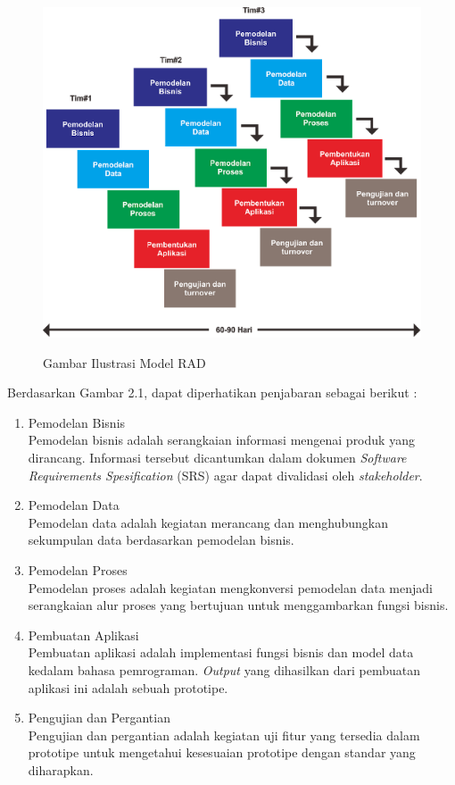 \begin{flushleft}
\begin{justify}
\begin{figure}[ht]
	    \includegraphics[width=12cm]{images/RAD.png}\\
            \caption{Gambar Ilustrasi Model RAD}
        \end{figure}
        Berdasarkan Gambar 2.1, dapat diperhatikan penjabaran sebagai berikut :
        \begin{enumerate}[label=\alph*.]
            \item Pemodelan Bisnis\\
            Pemodelan bisnis adalah serangkaian informasi mengenai produk yang dirancang. Informasi tersebut dicantumkan dalam dokumen \emph{Software Requirements Spesification} (SRS) agar dapat divalidasi oleh \emph{stakeholder}. 
            \item Pemodelan Data\\
            Pemodelan data adalah kegiatan merancang dan menghubungkan sekumpulan data berdasarkan pemodelan bisnis.
            \item Pemodelan Proses\\
            Pemodelan proses adalah kegiatan mengkonversi pemodelan data menjadi serangkaian alur proses yang bertujuan untuk menggambarkan fungsi bisnis.  
            \item Pembuatan Aplikasi\\
            Pembuatan aplikasi adalah  implementasi fungsi bisnis dan model data  kedalam bahasa pemrograman. \emph{Output} yang dihasilkan dari pembuatan aplikasi ini adalah sebuah prototipe. 
            \item Pengujian dan Pergantian\\
            Pengujian dan pergantian adalah kegiatan uji fitur yang tersedia dalam prototipe untuk mengetahui kesesuaian prototipe dengan standar yang diharapkan.\\
        \end{enumerate}


\end{justify}
\end{flushleft}
